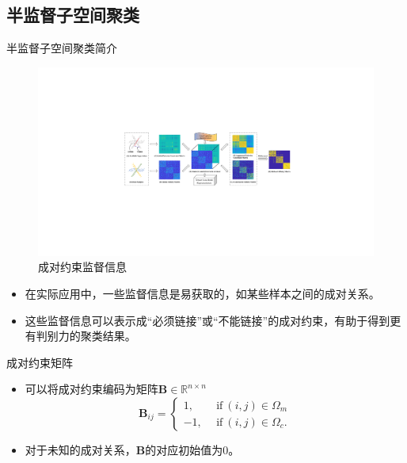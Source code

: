 \documentclass{beamer}
\begin{document}
\subsection{半监督子空间聚类}

\begin{frame}{半监督子空间聚类简介}


    \vspace{-0.3cm}
    \begin{figure}[htpb]
        \centering
        \includegraphics[width=0.25\linewidth]{pic/zhiguantu4_superpart.pdf}
        \caption{成对约束监督信息}
    \end{figure}

    \begin{itemize}
        \item 在实际应用中，一些监督信息是易获取的，如某些样本之间的成对关系。
        
        \item 这些监督信息可以表示成“必须链接”或“不能链接”的成对约束，有助于得到更有判别力的聚类结果。
 
    \end{itemize}

\end{frame}

\begin{frame}{成对约束矩阵}

    \begin{itemize}
        
        \item 可以将成对约束编码为矩阵$\mathbf{B}\in\mathbb{R}^{n\times n}$
    	\begin{equation}
    		\mathbf{B}_{ij}=\left\{\begin{aligned}
    			1, &~~\text{if}~(i, j) \in \Omega_{m} \\
    			-1, &~~\text{if}~(i, j) \in \Omega_{c}.
    		\end{aligned}\right.
    	\end{equation}
    	
        \item 对于未知的成对关系，$\mathbf{B}$的对应初始值为0。
        
 
    \end{itemize}

\end{frame}
\end{document}
